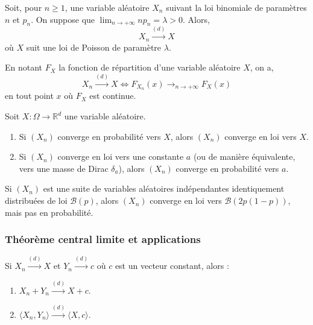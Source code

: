 	\begin{application}
		Soit, pour $n \geq 1$, une variable aléatoire $X_n$ suivant la loi binomiale de paramètres $n$ et $p_n$. On suppose que $\lim_{n \rightarrow +\infty} n p_n = \lambda > 0$.
		Alors,
		\[ X_n \overset{(d)}{\longrightarrow} X \]
		où $X$ suit une loi de Poisson de paramètre $\lambda$.
	\end{application}
	
	
	\begin{theorem}
		En notant $F_X$ la fonction de répartition d'une variable aléatoire $X$, on a,
		\[ X_n \overset{(d)}{\longrightarrow} X \iff F_{X_n}(x) \longrightarrow_{n \rightarrow +\infty} F_X(x) \]
		en tout point $x$ où $F_X$ est continue.
	\end{theorem}
	
	\begin{theorem}
		Soit $X : \Omega \rightarrow \mathbb{R}^d$ une variable aléatoire.
		\begin{enumerate}[label=(\roman*)]
			\item Si $(X_n)$ converge en probabilité vers $X$, alors $(X_n)$ converge en loi vers $X$.
			\item Si $(X_n)$ converge en loi vers une constante $a$ (ou de manière équivalente, vers une masse de Dirac $\delta_a$), alors $(X_n)$ converge en probabilité vers $a$.
		\end{enumerate}
	\end{theorem}
	
	\reference[HAU]{362}
	
	\begin{cexample}
		Si $(X_n)$ est une suite de variables aléatoires indépendantes identiquement distribuées de loi $\mathcal{B}(p)$, alors $(X_n)$ converge en loi vers $\mathcal{B}(2p(1-p))$, mais pas en probabilité.
	\end{cexample}
	
	\subsubsection{Théorème central limite et applications}
	
	\reference[G-K]{305}
	
	\begin{theorem}[Slutsky]
		Si $X_n \overset{(d)}{\longrightarrow} X$ et $Y_n \overset{(d)}{\longrightarrow} c$ où $c$ est un vecteur constant, alors :
		\begin{enumerate}[label=(\roman*)]
			\item $X_n + Y_n \overset{(d)}{\longrightarrow} X + c$.
			\item $\langle X_n, Y_n \rangle \overset{(d)}{\longrightarrow} \langle X, c \rangle$.
		\end{enumerate}
	\end{theorem}
	
